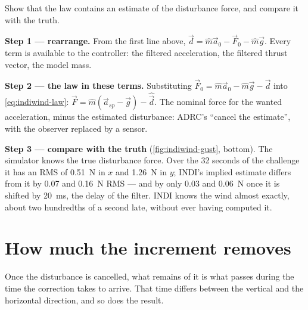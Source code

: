 \begin{example}
\label{ex:indiwind-dist}
Show that the law contains an estimate of the disturbance force, and compare it with the truth.

\textbf{Step 1 — rearrange.} From the first line above, $\vec d = \hat m\vec a_0 - \vec F_0 - \hat m\vec g$. Every term is available to the controller: the filtered acceleration, the filtered thrust vector, the model mass.

\textbf{Step 2 — the law in these terms.} Substituting $\vec F_0 = \hat m\vec a_0 - \hat m\vec g - \vec d$ into \cref{eq:indiwind-law}: $\vec F = \hat m(\vec a_{sp} - \vec g) - \hat{\vec d}$. The nominal force for the wanted acceleration, minus the estimated disturbance: ADRC's \enquote{cancel the estimate}, with the observer replaced by a sensor.

\textbf{Step 3 — compare with the truth} (\cref{fig:indiwind-gust}, bottom). The simulator knows the true disturbance force. Over the 32 seconds of the challenge it has an RMS of \SI{0.51}{N} in $x$ and \SI{1.26}{N} in $y$; INDI's implied estimate differs from it by 0.07 and \SI{0.16}{N} RMS — and by only 0.03 and \SI{0.06}{N} once it is shifted by \SI{20}{ms}, the delay of the filter. INDI knows the wind almost exactly, about two hundredths of a second late, without ever having computed it.
\end{example}


\section{How much the increment removes}

Once the disturbance is cancelled, what remains of it is what passes during the time the correction takes to arrive. That time differs between the vertical and the horizontal direction, and so does the result.


